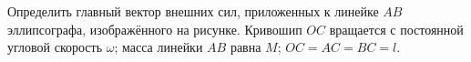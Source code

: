 Определить главный вектор внешних сил, приложенных к линейке $AB$ эллипсографа,
изображённого на рисунке.
Кривошип $OC$ вращается с постоянной угловой скорость $\omega$;
масса линейки $AB$ равна $M$; $OC = AC = BC = l$.
